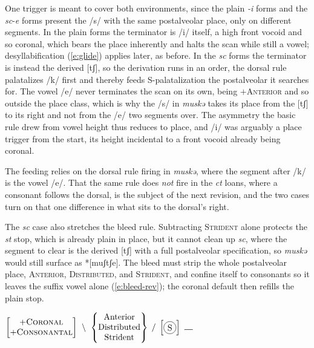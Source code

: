\documentclass[11pt,letterpaper]{article}
\newcommand{\gap}{\rule{1em}{0.5pt}}
\newcommand{\word}[1]{\textit{#1}}
\newcommand{\feature}[1]{\textsc{#1}}
\newcommand{\featspec}[2]{\ensuremath{#1}\textsc{#2}}
\newcommand*\circled[1]{\tikz[baseline=(char.base)]{
            \node[shape=circle,draw,inner sep=2pt] (char) {#1};}}
\begin{document}
\noindent
One trigger is meant to cover both environments, since the plain \word{-i} forms and the \word{sc}-\word{e} forms present the /s/ with the same postalveolar place, only on different segments.
In the plain forms the terminator is /i/ itself, a high front vocoid and so coronal, which bears the place inherently and halts the scan while still a vowel; desyllabification (\ref{e:glide}) applies later, as before.
In the \word{sc} forms the terminator is instead the derived [tʃ], so the derivation runs in an order, the dorsal rule palatalizes /k/ first and thereby feeds S-palatalization the postalveolar it searches for.
The vowel /e/ never terminates the scan on its own, being \featspec{+}{Anterior} and so outside the place class, which is why the /s/ in \word{muskə} takes its place from the [tʃ] to its right and not from the /e/ two segments over.
The asymmetry the basic rule drew from vowel height thus reduces to place, and /i/ was arguably a place trigger from the start, its height incidental to a front vocoid already being coronal.

\bigskip\noindent
The feeding relies on the dorsal rule firing in \word{muskə}, where the segment after /k/ is the vowel /e/.
That the same rule does \emph{not} fire in the \word{ct} loans, where a consonant follows the dorsal, is the subject of the next revision, and the two cases turn on that one difference in what sits to the dorsal's right.

\bigskip\noindent
The \word{sc} case also stretches the bleed rule.
Subtracting \feature{Strident} alone protects the \word{st} stop, which is already plain in place, but it cannot clean up \word{sc}, where the segment to clear is the derived [tʃ] with a full postalveolar specification, so \word{muskə} would still surface as *[muʃtʃe].
The bleed must strip the whole postalveolar place, \feature{Anterior}, \feature{Distributed}, and \feature{Strident}, and confine itself to consonants so it leaves the suffix vowel alone (\ref{e:bleed-rev}); the coronal default then refills the plain stop.

\begin{unlabeledexample}
\small\hfill$\displaystyle
\begin{bmatrix}
\featspec{+}{Coronal}\\
\featspec{+}{Consonantal}
\end{bmatrix}
~\setminus~
\begin{Bmatrix}
\text{Anterior}\\
\text{Distributed}\\
\text{Strident}
\end{Bmatrix}
\;/\;
\begin{bmatrix}
\circled{S}
\end{bmatrix}
~\gap
$\hfill\null
\label{e:bleed-rev}
\end{unlabeledexample}
\end{document}
